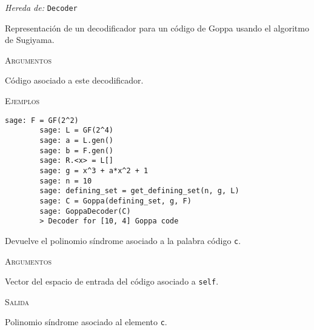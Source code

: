 \begin{description}[leftmargin=1em, font=\normalfont\ttfamily, style=nextline]
    \item[class GoppaDecoder(self, code)]
    
    \emph{Hereda de:} \texttt{Decoder}
  
    Representación de un decodificador para un código de Goppa usando el algoritmo de Sugiyama.
  
    \textsc{Argumentos}
    \begin{description}[font=\normalfont\ttfamily]
        \item[code] Código asociado a este decodificador.
    \end{description}

    \textsc{Ejemplos}
    \begin{lstlisting}[gobble=4]
        sage: F = GF(2^2)
        sage: L = GF(2^4)
        sage: a = L.gen()
        sage: b = F.gen()
        sage: R.<x> = L[]
        sage: g = x^3 + a*x^2 + 1
        sage: n = 10
        sage: defining_set = get_defining_set(n, g, L)
        sage: C = Goppa(defining_set, g, F)
        sage: GoppaDecoder(C)
        > Decoder for [10, 4] Goppa code
    \end{lstlisting}

    \begin{description}[font=\ttfamily, style=nextline]
        \item[get\_syndrome(self, c)] Devuelve el polinomio síndrome asociado a la palabra código \texttt{c}.
        
        \textsc{Argumentos}
        \begin{description}[font=\normalfont\ttfamily]
            \item[c] Vector del espacio de entrada del código asociado a \texttt{self}.
        \end{description}

        \textsc{Salida}
        \begin{description}[font=\normalfont\ttfamily]
            \item[] Polinomio síndrome asociado al elemento \texttt{c}.
        \end{description}


\end{description}
\end{description}

